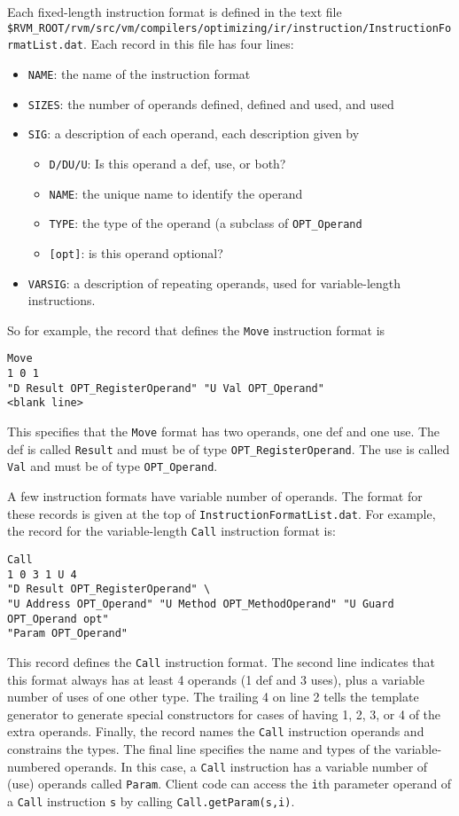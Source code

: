 Each fixed-length instruction format is defined in the text file 
{\tt \$RVM\_ROOT/rvm/src/vm/compilers/optimizing/ir/instruction/InstructionFormatList.dat}.
Each record in this file has four lines:
\begin{itemize}
\item {\tt NAME}: the name of the instruction format
\item {\tt SIZES}: the number of operands defined, defined and used, and used 
\item {\tt SIG}: a description of each operand, each description given
by
\begin{itemize}
\item {\tt D/DU/U}: Is this operand a def, use, or both?
\item {\tt NAME}: the unique name to identify the operand
\item {\tt TYPE}: the type of the operand (a subclass of {\tt OPT\_Operand}
\item {\tt [opt]}: is this operand optional?
\end{itemize}
\item {\tt VARSIG}: a description of repeating operands, used for
variable-length instructions.
\end{itemize}

So for example, the record that defines the {\tt Move} instruction format
is
\begin{verbatim}
Move
1 0 1
"D Result OPT_RegisterOperand" "U Val OPT_Operand"
<blank line>
\end{verbatim}

This specifies that the {\tt Move} format has two operands, one def and one
use.  The def is called {\tt Result} and must be of
type {\tt OPT\_RegisterOperand}.
The use is called {\tt Val} and must be of type {\tt OPT\_Operand}.

A few instruction formats have variable number of operands.  The
format for these records is given at the top of {\tt InstructionFormatList.dat}.
For example, the record for the variable-length {\tt Call} instruction
format is: 
\begin{verbatim}
Call
1 0 3 1 U 4
"D Result OPT_RegisterOperand" \
"U Address OPT_Operand" "U Method OPT_MethodOperand" "U Guard OPT_Operand opt"
"Param OPT_Operand"
\end{verbatim}
This record defines the {\tt Call} instruction format.  The second line
indicates that this format always has at least 4 operands (1 def and 3 uses),
plus a variable number of uses of one other type.  The trailing
4 on line 2 tells the template generator to generate special constructors
for cases of having 1, 2, 3, or 4 of the extra operands.
Finally, the record names the {\tt Call} instruction operands and
constrains the types.  The final line specifies the name and
types of the variable-numbered operands.  In this case, a {\tt Call}
instruction has a variable number of (use) operands called {\tt Param}.
Client code can access the {\tt i}th parameter operand of a {\tt Call}
instruction {\tt s} by calling {\tt Call.getParam(s,i)}.


